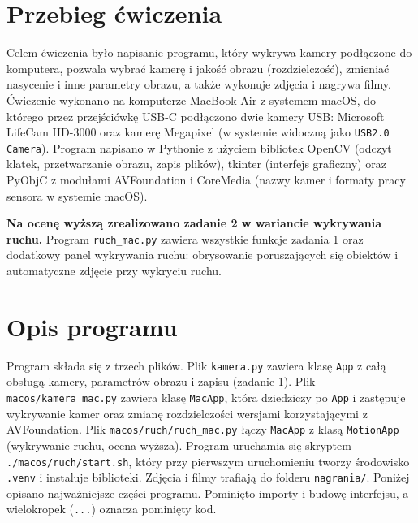 



\section{Przebieg ćwiczenia}
Celem ćwiczenia było napisanie programu, który wykrywa kamery podłączone do komputera, pozwala
wybrać kamerę i jakość obrazu (rozdzielczość), zmieniać nasycenie i inne parametry obrazu, a także
wykonuje zdjęcia i nagrywa filmy. Ćwiczenie wykonano na komputerze MacBook Air z systemem macOS,
do którego przez przejściówkę USB-C podłączono dwie kamery USB: Microsoft LifeCam HD-3000 oraz
kamerę Megapixel (w systemie widoczną jako \texttt{USB2.0 Camera}). Program napisano w Pythonie z użyciem bibliotek OpenCV (odczyt klatek,
przetwarzanie obrazu, zapis plików), tkinter (interfejs graficzny) oraz PyObjC z modułami
AVFoundation i CoreMedia (nazwy kamer i formaty pracy sensora w systemie macOS).

\textbf{Na ocenę wyższą zrealizowano zadanie 2 w wariancie wykrywania ruchu.} Program
\texttt{ruch\_mac.py} zawiera wszystkie funkcje zadania 1 oraz dodatkowy panel wykrywania ruchu:
obrysowanie poruszających się obiektów i automatyczne zdjęcie przy wykryciu ruchu.

\section{Opis programu}
Program składa się z trzech plików. Plik \texttt{kamera.py} zawiera klasę \texttt{App} z całą
obsługą kamery, parametrów obrazu i zapisu (zadanie 1). Plik \texttt{macos/kamera\_mac.py} zawiera
klasę \texttt{MacApp}, która dziedziczy po \texttt{App} i zastępuje wykrywanie kamer oraz zmianę
rozdzielczości wersjami korzystającymi z AVFoundation. Plik \texttt{macos/ruch/ruch\_mac.py}
łączy \texttt{MacApp} z klasą \texttt{MotionApp} (wykrywanie ruchu, ocena wyższa).
Program uruchamia się skryptem \texttt{./macos/ruch/start.sh}, który przy pierwszym uruchomieniu
tworzy środowisko \texttt{.venv} i instaluje biblioteki. Zdjęcia i filmy trafiają do folderu
\texttt{nagrania/}. Poniżej opisano najważniejsze części programu. Pominięto importy i budowę
interfejsu, a wielokropek (\texttt{...}) oznacza pominięty kod.

